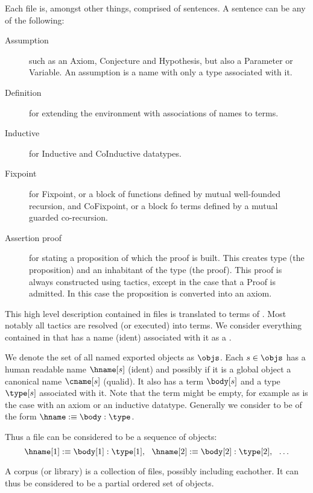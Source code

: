 Each file is, amongst other things, comprised of sentences.
A sentence can be any of the following:
\begin{description}
	\item[Assumption] such as an Axiom, Conjecture and Hypothesis, but also a Parameter or Variable.
		An assumption is a name with only a type associated with it.
	\item[Definition] for extending the environment with associations of names to terms.
		
	\item[Inductive] for Inductive and CoInductive datatypes.
	\item[Fixpoint] for Fixpoint, or a block of functions defined by mutual well-founded recursion, and CoFixpoint, or a block fo terms defined by a mutual guarded co-recursion.
	\item[Assertion proof] for stating a proposition of which the proof is built.
		This creates type (the proposition) and an inhabitant of the type (the proof).
		This proof is always constructed using tactics, except in the case that a Proof is admitted.
		In this case the proposition is converted into an axiom.
\end{description}


This high level description contained in \coq files is translated to terms of \pcic.
Most notably all tactics are resolved (or executed) into terms.
We consider everything contained in \pcic that has a name (ident) associated with it as a \coqobj.

\begin{definition}[{\coqobj[s]}]
	We denote the set of all named exported \coq objects as $\objs$.
	Each \coqobj $s \in \objs$ has a human readable name $\hname[s]$ (ident) and possibly if it is a global object a canonical name $\cname[s]$ (qualid).
	It also has a term $\body[s]$ and a type $\type[s]$ associated with it.
	Note that the term might be empty, for example as is the case with an axiom or an inductive datatype.
	Generally we consider \coqobj[s] to be of the form $\hname :\equiv \body : \type$.
\end{definition}

Thus a \coq file can be considered to be a sequence of \coq objects:
$$ \hname[1] :\equiv \body[1] : \type[1], ~~ \hname[2] :\equiv \body[2] : \type[2], ~~ \ldots $$

A \coq corpus (or library) is a collection of \coq files, possibly including eachother.
It can thus be considered to be a partial ordered set of \coq objects.

